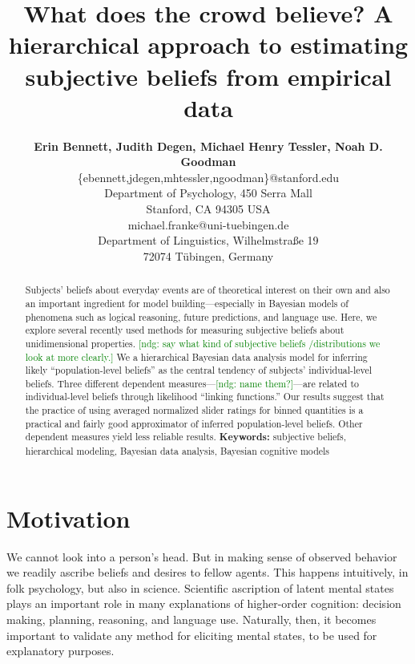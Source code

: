 \documentclass[10pt,letterpaper]{article}
\title{What does the crowd believe? A hierarchical approach to estimating subjective beliefs
  from empirical data}
\author{{\large \bf Erin Bennett, Judith Degen, Michael Henry Tessler, Noah D. Goodman}\\
     \{ebennett,jdegen,mhtessler,ngoodman\}@stanford.edu \\
     Department of Psychology, 450 Serra Mall \\
  Stanford, CA 94305 USA \AND {\large \bf Michael Franke} \\
  michael.franke@uni-tuebingen.de \\
  Department of Linguistics, Wilhelmstra\ss e 19 \\
 72074 T\"{u}bingen, Germany
  \AND}
\newcommand{\ndg}[1]{\textcolor{Green}{[ndg: #1]}}
\begin{document}
\maketitle




\begin{abstract}
  Subjects' beliefs about everyday events are of theoretical interest on their own and also an
  important ingredient for model building---especially in Bayesian models of phenomena such as logical
  reasoning, future predictions, and language use. Here, we explore several recently used 
  methods for measuring subjective beliefs about unidimensional properties. \ndg{say what kind of subjective beliefs /distributions we look at more clearly.} 
  We a hierarchical Bayesian data analysis model for inferring likely ``population-level beliefs'' as the central
  tendency of subjects' individual-level beliefs. 
  Three different dependent measures---\ndg{name them?}---are related to individual-level beliefs through likelihood ``linking functions.''
  Our results suggest that the practice of
  using averaged normalized slider ratings for binned quantities is a practical and fairly good
  approximator of inferred population-level beliefs.
  Other dependent measures yield less reliable results.
\textbf{Keywords:} subjective beliefs, hierarchical modeling, Bayesian data analysis, Bayesian
cognitive models 
\end{abstract}




\section{Motivation}

We cannot look into a person's head. But in making sense of observed behavior we readily
ascribe beliefs and desires to fellow agents. This happens intuitively, in folk psychology, but
also in science. Scientific ascription of latent mental states plays an important role in many
explanations of higher-order cognition: decision making, planning, reasoning,
and language use. Naturally, then, it becomes important to validate any method for eliciting mental states, 
to be used for explanatory purposes.
\end{document}
